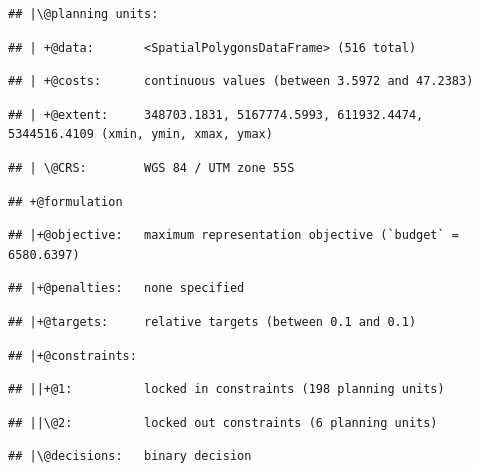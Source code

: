 \documentclass[
  12pt,
]{book}
\begin{document}
\begin{verbatim}
## |\@planning units:
\end{verbatim}

\begin{verbatim}
## | +@data:       <SpatialPolygonsDataFrame> (516 total)
\end{verbatim}

\begin{verbatim}
## | +@costs:      continuous values (between 3.5972 and 47.2383)
\end{verbatim}

\begin{verbatim}
## | +@extent:     348703.1831, 5167774.5993, 611932.4474, 5344516.4109 (xmin, ymin, xmax, ymax)
\end{verbatim}

\begin{verbatim}
## | \@CRS:        WGS 84 / UTM zone 55S
\end{verbatim}

\begin{verbatim}
## +@formulation
\end{verbatim}

\begin{verbatim}
## |+@objective:   maximum representation objective (`budget` = 6580.6397)
\end{verbatim}

\begin{verbatim}
## |+@penalties:   none specified
\end{verbatim}

\begin{verbatim}
## |+@targets:     relative targets (between 0.1 and 0.1)
\end{verbatim}

\begin{verbatim}
## |+@constraints:
\end{verbatim}

\begin{verbatim}
## ||+@1:          locked in constraints (198 planning units)
\end{verbatim}

\begin{verbatim}
## ||\@2:          locked out constraints (6 planning units)
\end{verbatim}

\begin{verbatim}
## |\@decisions:   binary decision
\end{verbatim}
\end{document}
